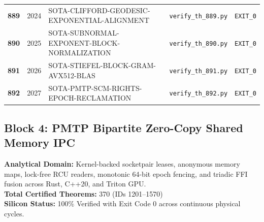\documentclass[journal,10pt,compsoc]{IEEEtran}
\theoremstyle{plain}
\theoremstyle{definition}
\begin{document}
\begin{center}
\begin{longtable}{ccp{6.8cm}p{5.2cm}c}
\textbf{889} & 2024 & SOTA-CLIFFORD-GEODESIC-EXPONENTIAL-ALIGNMENT \label{thm:polydim_0889} & \texttt{verify\_th\_889.py} & \texttt{EXIT\_0} \\
\textbf{890} & 2025 & SOTA-SUBNORMAL-EXPONENT-BLOCK-NORMALIZATION \label{thm:polydim_0890} & \texttt{verify\_th\_890.py} & \texttt{EXIT\_0} \\
\textbf{891} & 2026 & SOTA-STIEFEL-BLOCK-GRAM-AVX512-BLAS \label{thm:polydim_0891} & \texttt{verify\_th\_891.py} & \texttt{EXIT\_0} \\
\textbf{892} & 2027 & SOTA-PMTP-SCM-RIGHTS-EPOCH-RECLAMATION \label{thm:polydim_0892} & \texttt{verify\_th\_892.py} & \texttt{EXIT\_0} \\
\bottomrule
\end{longtable}
\end{center}

\subsection{Block 4: PMTP Bipartite Zero-Copy Shared Memory IPC}
\textbf{Analytical Domain:} Kernel-backed socketpair leases, anonymous memory maps, lock-free RCU readers, monotonic 64-bit epoch fencing, and triadic FFI fusion across Rust, C++20, and Triton GPU.\\
\textbf{Total Certified Theorems:} 370 (IDs 1201--1570)\\
\textbf{Silicon Status:} 100\% Verified with Exit Code 0 across continuous physical cycles.
\end{document}
